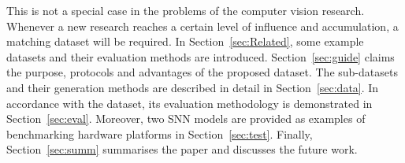 This is not a special case in the problems of the computer vision research.
Whenever a new research reaches a certain level of influence and accumulation, a matching dataset will be required.
In Section~\ref{sec:Related}, some example datasets and their evaluation methods are introduced.
Section~\ref{sec:guide} claims the purpose, protocols and advantages of the proposed dataset.
The sub-datasets and their generation methods are described in detail in Section~\ref{sec:data}.
In accordance with the dataset, its evaluation methodology is demonstrated in Section~\ref{sec:eval}.
Moreover, two SNN models are provided as examples of benchmarking hardware platforms in Section~\ref{sec:test}.
Finally, Section~\ref{sec:summ} summarises the paper and discusses the future work.